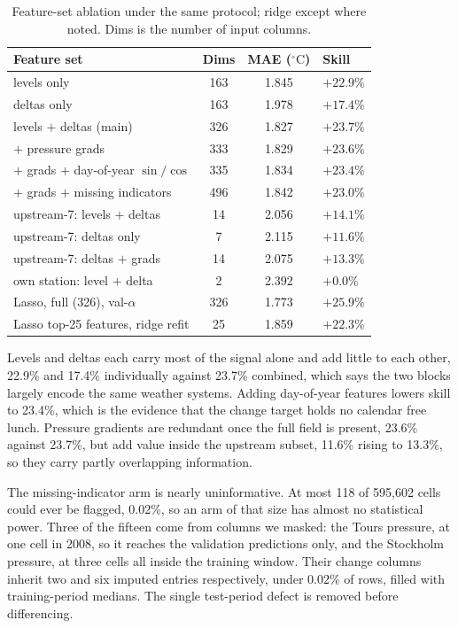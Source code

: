 \documentclass[11pt,a4paper]{article}
\newcommand{\tc}{\ensuremath{^{\circ}\mathrm{C}}}
\begin{document}
\begin{table}[htbp]
\centering
\caption{Feature-set ablation under the same protocol; ridge except where noted. Dims is the number of input columns.}
\label{tab:ablation}
\small
\begin{tabular}{@{}lccl@{}}
\toprule
Feature set & Dims & MAE (\tc) & Skill \\
\midrule
levels only & 163 & 1.845 & $+22.9\%$ \\
deltas only & 163 & 1.978 & $+17.4\%$ \\
levels $+$ deltas (main) & 326 & 1.827 & $+23.7\%$ \\
$+$ pressure grads & 333 & 1.829 & $+23.6\%$ \\
$+$ grads $+$ day-of-year $\sin/\cos$ & 335 & 1.834 & $+23.4\%$ \\
$+$ grads $+$ missing indicators & 496 & 1.842 & $+23.0\%$ \\
upstream-7: levels $+$ deltas & 14 & 2.056 & $+14.1\%$ \\
upstream-7: deltas only & 7 & 2.115 & $+11.6\%$ \\
upstream-7: deltas $+$ grads & 14 & 2.075 & $+13.3\%$ \\
own station: level $+$ delta & 2 & 2.392 & $+0.0\%$ \\
\addlinespace
Lasso, full (326), val-$\alpha$ & 326 & 1.773 & $+25.9\%$ \\
Lasso top-25 features, ridge refit & 25 & 1.859 & $+22.3\%$ \\
\bottomrule
\end{tabular}
\end{table}

Levels and deltas each carry most of the signal alone and add little to each other, 22.9\% and 17.4\% individually against 23.7\% combined, which says the two blocks largely encode the same weather systems. Adding day-of-year features lowers skill to 23.4\%, which is the evidence that the change target holds no calendar free lunch. Pressure gradients are redundant once the full field is present, 23.6\% against 23.7\%, but add value inside the upstream subset, 11.6\% rising to 13.3\%, so they carry partly overlapping information.

The missing-indicator arm is nearly uninformative. At most 118 of 595{,}602 cells could ever be flagged, 0.02\%, so an arm of that size has almost no statistical power. Three of the fifteen come from columns we masked: the Tours pressure, at one cell in 2008, so it reaches
the validation predictions only, and the Stockholm pressure, at three cells all inside the training window.
Their change columns inherit two and six imputed entries respectively, under 0.02\% of rows, filled with
training-period medians. The single test-period defect is removed before differencing.
\end{document}
